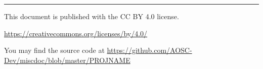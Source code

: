 

\vspace{20mm}
\vfill

\begin{minipage}{\linewidth}
    \sffamily
    \color{black!80}\raggedright\fontsize{10pt}{10pt}\selectfont
    \hrule
    \vspace{10pt}

    This document is published with the CC BY 4.0 license.
    
    \href{https://creativecommons.org/licenses/by/4.0/}{https://creativecommons.org/licenses/by/4.0/}

    You may find the source code at \href{https://github.com/AOSC-Dev/miscdoc/blob/master/PROJNAME}{https://github.com/AOSC-Dev/miscdoc/blob/master/PROJNAME}
\end{minipage}
